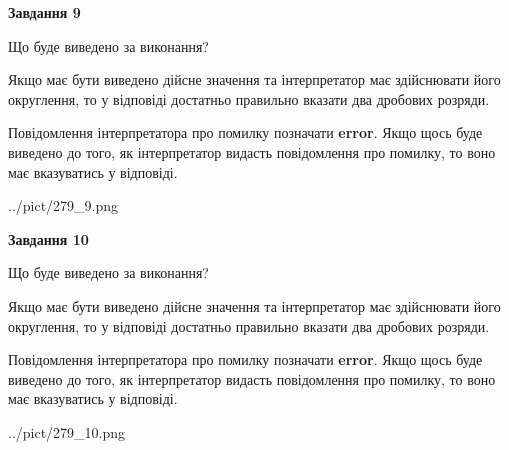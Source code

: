 \documentclass[12pt, ukrainian]{article}
\begin{document}
{\begin {Large}
{\begin {center}\textbf{Завдання 9}\end {center}}\par
Що буде виведено за виконання? \par

Якщо має бути виведено дійсне значення та інтерпретатор має здійснювати його округлення, 
то у відповіді достатньо правильно вказати два дробових розряди.

Повідомлення інтерпретатора про помилку позначати \textbf{error}.
Якщо щось буде виведено до того, як інтерпретатор видасть повідомлення про помилку, 
то воно має вказуватись у відповіді. \par

\begin{center}
	{../pict/279_9.png}
\end{center}
\newpage

{\begin {center}\textbf{Завдання 10}\end {center}}\par
Що буде виведено за виконання? \par

Якщо має бути виведено дійсне значення та інтерпретатор має здійснювати його округлення, 
то у відповіді достатньо правильно вказати два дробових розряди.

Повідомлення інтерпретатора про помилку позначати \textbf{error}.
Якщо щось буде виведено до того, як інтерпретатор видасть повідомлення про помилку, 
то воно має вказуватись у відповіді. \par

\begin{center}
	{../pict/279_10.png}
\end{center}
\newpage

\end {Large}}
\end{document}
